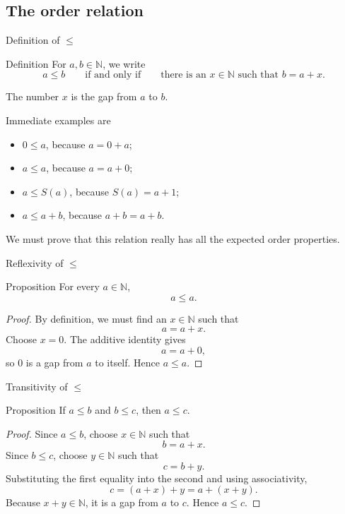 \documentclass[aspectratio=169,11pt]{beamer}
\newcommand{\N}{\mathbb N}
\newcommand{\suc}[1]{S(#1)}
\begin{document}
\subsection{The order relation}

\begin{frame}{Definition of \(\leq\)}
  \begin{block}{Definition}
    For \(a,b\in\N\), we write
    \[
      \boxed{a\le b}
      \qquad\text{if and only if}\qquad
      \boxed{\text{there is an }x\in\N\text{ such that }b=a+x.}
    \]
  \end{block}

  The number \(x\) is the \alert{gap} from \(a\) to \(b\).

  Immediate examples are
  \begin{itemize}
    \item \(0\le a\), because \(a=0+a\);
    \item \(a\le a\), because \(a=a+0\);
    \item \(a\le\suc a\), because \(\suc a=a+1\);
    \item \(a\le a+b\), because \(a+b=a+b\).
  \end{itemize}

  We must prove that this relation really has all the expected order properties.
\end{frame}

\begin{frame}{Reflexivity of \(\leq\)}
  \begin{block}{Proposition}
    For every \(a\in\N\),
    \[
      a\le a.
    \]
  \end{block}

  \begin{proof}
    By definition, we must find an \(x\in\N\) such that
    \[
      a=a+x.
    \]
    Choose \(x=0\).  The additive identity gives
    \[
      a=a+0,
    \]
    so \(0\) is a gap from \(a\) to itself.  Hence \(a\le a\).
  \end{proof}
\end{frame}

\begin{frame}{Transitivity of \(\leq\)}
  \begin{block}{Proposition}
    If \(a\le b\) and \(b\le c\), then \(a\le c\).
  \end{block}

  \begin{proof}
    Since \(a\le b\), choose \(x\in\N\) such that
    \[
      b=a+x.
    \]
    Since \(b\le c\), choose \(y\in\N\) such that
    \[
      c=b+y.
    \]
    Substituting the first equality into the second and using associativity,
    \[
      c=(a+x)+y=a+(x+y).
    \]
    Because \(x+y\in\N\), it is a gap from \(a\) to \(c\).  Hence \(a\le c\).
  \end{proof}
\end{frame}
\end{document}
